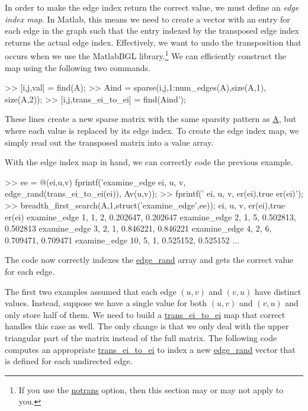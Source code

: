 \documentclass[12pt]{article}
\newcommand{\mycmd}[1]{\url{#1}}
\begin{document}
In order to make the edge index return the correct value, we must define an \emph{edge index map}.  In Matlab, this means we need to create a vector with an entry for each edge in the graph such that the entry indexed by the transposed edge index returns the actual edge index.  Effectively, we want to undo the transposition that occurs when we use the MatlabBGL library.\footnote{If you use the \mycmd{notrans} option, then this section may or may not apply to you.}
We can efficiently construct the map using the following two commands.
\begin{mcode}
>> [i,j,val] = find(A);
>> Aind = sparse(i,j,1:num_edges(A),size(A,1), size(A,2));
>> [i,j,trans_ei_to_ei] = find(Aind');
\end{mcode}  
These lines create a new sparse matrix with the same sparsity pattern as \mycmd{A}, but where each value is replaced by its edge index.  To create the edge index map, we simply read out the transposed matrix into a value array.  

With the edge index map in hand, we can correctly code the previous example.
\begin{mcode}
>> ee = @(ei,u,v) fprintf('examine_edge   %
       ei, u, v, edge_rand(trans_ei_to_ei(ei)), Av(u,v));
>> fprintf('               ei,   u,   v,     er(ei),true er(ei)\n');
>> breadth_first_search(A,1,struct('examine_edge',ee));
               ei,   u,   v,     er(ei),true er(ei)
examine_edge    1,   1,   2,   0.202647,   0.202647
examine_edge    2,   1,   5,   0.502813,   0.502813
examine_edge    3,   2,   1,   0.846221,   0.846221
examine_edge    4,   2,   6,   0.709471,   0.709471
examine_edge   10,   5,   1,   0.525152,   0.525152
...
\end{mcode}
The code now correctly indexes the \mycmd{edge_rand} array and gets the correct value for each edge.

The first two examples assumed that each edge $(u,v)$ and $(v,u)$ have distinct values.  Instead, suppose we have a single value for both $(u,v)$ and $(v,u)$ and only store half of them.  We need to build a \mycmd{trans_ei_to_ei} map that correct handles this case as well.  The only change is that we only deal with the upper triangular part of the matrix instead of the full matrix.  The following code computes an appropriate \mycmd{trans_ei_to_ei} to index a new 
\mycmd{edge_rand} vector that is defined for each undirected edge.
\end{document}
